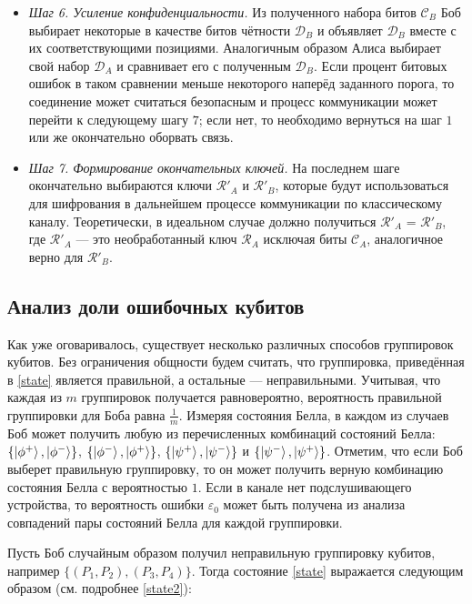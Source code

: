 \documentclass[a4paper,11pt]{article}
\begin{document}
\begin{itemize}
\item \textit{Шаг 6. Усиление конфиденциальности.} \cite{PA,vmk} Из полученного набора битов $\mathcal{C}_B$ Боб выбирает некоторые в качестве битов чётности $\mathcal{D}_B$ и объявляет $\mathcal{D}_B$ вместе с их соответствующими позициями. Аналогичным образом Алиса выбирает свой набор $\mathcal{D}_A$ и сравнивает его с полученным $\mathcal{D}_B$. Если процент битовых ошибок в таком сравнении меньше некоторого наперёд заданного порога, то соединение может считаться безопасным и процесс коммуникации может перейти к следующему шагу $7$; если нет, то необходимо вернуться на шаг $1$ или же окончательно оборвать связь.

\item \textit{Шаг 7. Формирование окончательных ключей.} На последнем шаге окончательно выбираются ключи $\mathcal{R'}_A$ и $\mathcal{R'}_B$, которые будут использоваться для шифрования в дальнейшем процессе коммуникации по классическому каналу. Теоретически, в идеальном случае должно получиться $\mathcal{R'}_A$ = $\mathcal{R'}_B$, где $\mathcal{R'}_A$ --- это необработанный ключ $\mathcal{R}_A$ исключая биты $\mathcal{C}_A$, аналогичное верно для $\mathcal{R'}_B$.
\end{itemize}

\subsection{Анализ доли ошибочных кубитов}

Как уже оговаривалось, существует несколько различных способов группировок кубитов. Без ограничения общности будем считать, что группировка, приведённая в \eqref{state} является правильной, а остальные --- неправильными. Учитывая, что каждая из $m$ группировок получается равновероятно, вероятность правильной группировки для Боба равна $\frac{1}{m}$. Измеряя состояния Белла, в каждом из случаев Боб может получить любую из перечисленных комбинаций состояний Белла: $\{\ket{\phi^+}, \ket{\phi^-}\}$, $\{\ket{\phi^-}, \ket{\phi^+}\}$, $\{\ket{\psi^+}, \ket{\psi^-}\}$ и $\{\ket{\psi^-}, \ket{\psi^+}\}$.
Отметим, что если Боб выберет правильную группировку, то он может получить верную комбинацию состояния Белла с вероятностью $1$. Если в канале нет подслушивающего устройства, то вероятность ошибки $\varepsilon_0$ может быть получена из анализа совпадений пары состояний Белла для каждой группировки.

Пусть Боб случайным образом получил неправильную группировку кубитов, например $\{(P_1 , P_2), (P_3 , P_4)\}$. Тогда состояние \eqref{state} выражается следующим образом (см. подробнее \eqref{state2}):
\end{document}
